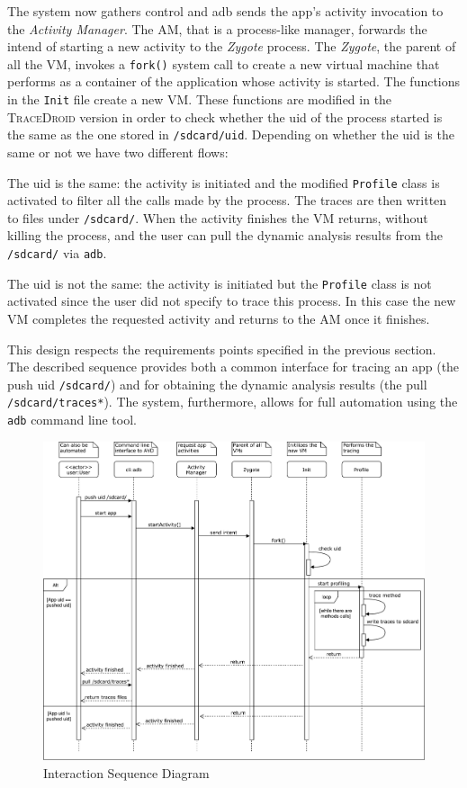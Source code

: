 The system now gathers control and adb sends the app's activity
invocation to the \textit{Activity Manager}. The AM, that is a process-like
manager, forwards the intend of starting a new activity to the \emph{Zygote}
process. The \emph{Zygote}, the parent of all the VM, invokes a \texttt{fork()} system
call to create a new virtual machine that performs as a container of
the application whose activity is started. The functions in the \texttt{Init} file create a new VM. These functions are modified in the \textsc{TraceDroid} version
in order to check whether the uid of the process started is the same as the
one stored in \texttt{/sdcard/uid}. Depending on whether the uid is the same or
not we have two different flows:
\begin{enumerate*}
  \item The uid is the same: the activity is initiated and the modified \texttt{Profile} class is activated to filter all the calls made by the process. The traces are then written to files under \texttt{/sdcard/}. When the activity finishes the VM returns, without killing the process, and the user can pull the dynamic analysis results from the \texttt{/sdcard/} via \texttt{adb}. 
  \item The uid is not the same: the activity is initiated but the \texttt{Profile} class is not activated since the user did not specify to trace this process. In this case the new VM completes the requested activity and returns to the AM once it finishes. 
\end{enumerate*}

This design respects the requirements points specified in the previous
section. The described sequence provides both a common interface for
tracing an app (the push uid \texttt{/sdcard/}) and for obtaining the dynamic
analysis results (the pull \texttt{/sdcard/traces*}). The system, furthermore,
allows for full automation using the \texttt{adb} command line tool.

\begin{figure}[!h]
    \centering
    \includegraphics[width=15cm]{./img/design/interaction.pdf}
    \caption{Interaction Sequence Diagram}
    \label{fig:scope_interaction}
\end{figure}
